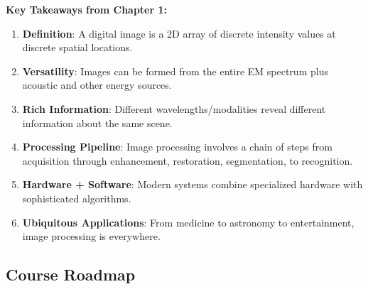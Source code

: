 \documentclass[12pt,a4paper]{article}
\begin{document}
\begin{importantbox}
\textbf{Key Takeaways from Chapter 1:}

\begin{enumerate}
    \item \textbf{Definition}: A digital image is a 2D array of discrete intensity values at discrete spatial locations.
    
    \item \textbf{Versatility}: Images can be formed from the entire EM spectrum plus acoustic and other energy sources.
    
    \item \textbf{Rich Information}: Different wavelengths/modalities reveal different information about the same scene.
    
    \item \textbf{Processing Pipeline}: Image processing involves a chain of steps from acquisition through enhancement, restoration, segmentation, to recognition.
    
    \item \textbf{Hardware + Software}: Modern systems combine specialized hardware with sophisticated algorithms.
    
    \item \textbf{Ubiquitous Applications}: From medicine to astronomy to entertainment, image processing is everywhere.
\end{enumerate}
\end{importantbox}

\subsection{Course Roadmap}
\end{document}
